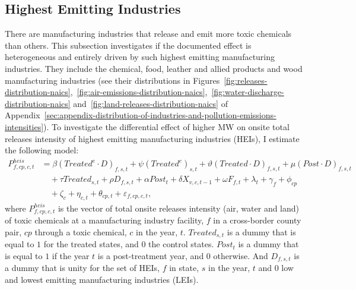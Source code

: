 \documentclass{C:/Users/david/OneDrive/Documents/ULMS/PhD/Thesis/chapter3/src/climate_change/latex/Economic_Journal/OUP-EJ}
\begin{document}
    \subsection{Highest Emitting Industries}\label{subsec:highest-emitting-industries}
    There are manufacturing industries that release and emit more toxic chemicals than others. This subsection investigates if the documented effect is heterogeneous and entirely driven by such highest emitting manufacturing industries. They include the chemical, food, leather and allied products and wood manufacturing industries (see their distributions in Figures~\ref{fig:releases-distribution-naics},~\ref{fig:air-emissions-distribution-naics},~\ref{fig:water-discharge-distribution-naics} and~\ref{fig:land-releases-distribution-naics} of Appendix~\ref{sec:appendix-distribution-of-industries-and-pollution-emissions-intensities}). To investigate the differential effect of higher MW on onsite total releases intensity of highest emitting manufacturing industries (HEIs), I estimate the following model:
    \begin{align}
        P_{f,cp,c,t}^{heis} &= \beta (Treated^{e} \cdot D)_{f,s,t} + \psi (Treated^{e})_{s,t} + \vartheta (Treated \cdot D)_{f,s,t} + \mu (Post \cdot D)_{f,s,t} \nonumber \\
        &\quad + \tau Treated_{s,t} + \rho D_{f,s,t} + \alpha Post_{t} + \delta X_{v,c,t-1} + \omega F_{f,t} + \lambda_{t} + \gamma_{f} + \phi_{cp} \nonumber \\
        &\quad + \zeta_{c} + \eta_{c,t} + \theta_{cp,t} + \varepsilon_{f,cp,c,t},\label{eq:heterogeneous-onsite-releases-intensity-heis}
    \end{align}
    where $P_{f,cp,c,t}^{heis}$ is the vector of total onsite releases intensity (air, water and land) of toxic chemicals at a manufacturing industry facility, $f$ in a cross-border county pair, $cp$ through a toxic chemical, $c$ in the year, $t$. $Treated_{s,t}$ is a dummy that is equal to $1$ for the treated states, and $0$ the control states. $Post_{t}$ is a dummy that is equal to $1$ if the year $t$ is a post-treatment year, and $0$ otherwise. And $D_{f,s,t}$ is a dummy that is unity for the set of HEIs, $f$ in state, $s$ in the year, $t$ and $0$ low and lowest emitting manufacturing industries (LEIs).
    
\end{document}
